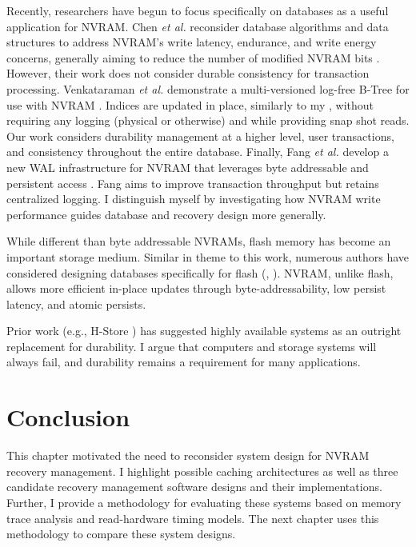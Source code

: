 Recently, researchers have begun to focus specifically on databases as a useful application for NVRAM.
Chen \emph{et al.} reconsider database algorithms and data structures to address NVRAM's write latency, endurance, and write energy concerns, generally aiming to reduce the number of modified NVRAM bits \cite{ChenGibbons11}.
However, their work does not consider durable consistency for transaction processing.
Venkataraman \emph{et al.} demonstrate a multi-versioned log-free B-Tree for use with NVRAM \cite{VenkataramanTolia11}.
Indices are updated in place, similarly to my \InPlace, without requiring any logging (physical or otherwise) and while providing snap shot reads.
Our work considers durability management at a higher level, user transactions, and consistency throughout the entire database.
Finally, Fang \emph{et al.} develop a new WAL infrastructure for NVRAM that leverages byte addressable and persistent access \cite{FangHsiao11}.
Fang aims to improve transaction throughput but retains centralized logging.
I distinguish myself by investigating how NVRAM write performance guides database and recovery design more generally.

While different than byte addressable NVRAMs, flash memory has become an important storage medium.
Similar in theme to this work, numerous authors have considered designing databases specifically for flash (\cite{BernsteinReid11}, \cite{SarwatMokbel11}).
NVRAM, unlike flash, allows more efficient in-place updates through byte-addressability, low persist latency, and atomic persists.

Prior work (e.g., H-Store \cite{StonebrakerMadden07}) has suggested highly available systems as an outright replacement for durability.
I argue that computers and storage systems will always fail, and durability remains a requirement for many applications.

\section{Conclusion}
\label{sec:OLTP_design:Conclusion}
This chapter motivated the need to reconsider system design for NVRAM recovery management.
I highlight possible caching architectures as well as three candidate recovery management software designs and their implementations.
Further, I provide a methodology for evaluating these systems based on memory trace analysis and read-hardware timing models.
The next chapter uses this methodology to compare these system designs.
